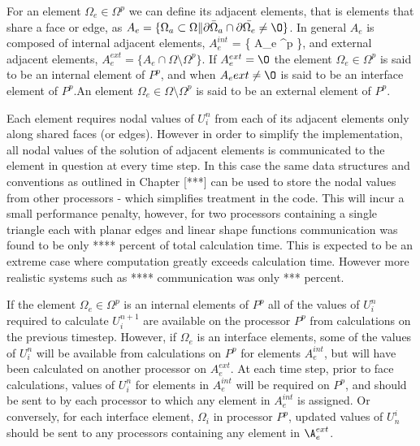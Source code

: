 For an element $\Omega_e \in \Omega^p$ we can define its adjacent elements, that is elements that share a face or edge, as $A_e = \{ \Omega_a \subset \Omega \| \partial \bar{\Omega}_a \cap \partial \bar{\Omega_e} \ne \O \}$. In general $A_e$ is composed of internal adjacent elements, $A_e^{int}$ = \{ A_e \cap \Omega^p \}, and external adjacent elements, $A_e^{ext} = \{ A_e \cap \Omega \setminus \Omega^p \}$. If $A_e^{ext} = \O$ the element $\Omega_e \in \Omega^p$ is said to be an internal element of $P^p$, and when $A_e{ext} \ne \O$ is said to be an interface element of $P^p$.An element $\Omega_e \in \Omega \setminus \Omega^p$ is said to be an external element of $P^p$.


Each element requires nodal values of $U_i^{n}$ from each of its adjacent elements only along shared faces (or edges). However in order to simplify the implementation, all nodal values of the solution of adjacent elements is communicated to the element in question at every time step. In this case the same data structures and conventions as outlined in Chapter [***] can be used to store the nodal values from other processors - which simplifies treatment in the code. This will incur a small performance penalty, however, for two processors containing a single triangle each with planar edges and linear shape functions communication was found to be only **** percent of total calculation time. This is expected to be an extreme case where computation greatly exceeds calculation time. However more realistic systems such as **** communication was only *** percent.

If the element $\Omega_e \in \Omega^p$ is an internal elements of $P^p$ all of the values of $U_i^n$ required to calculate $U_i^{n+1}$ are available on the processor $P^p$ from calculations on the previous timestep. However, if $\Omega_e$ is an interface elements, some of the values of $U_i^{n}$ will be available from calculations on $P^p$ for elements $A_e^{int}$, but will have been calculated on another processor on $A_e^{ext}$. At each time step, prior to face calculations, values of $U_i^{n}$ for elements in $A_e^{int}$ will be required on $P^p$, and should be sent to by each processor to which any element in $A_e^{int}$ is assigned. Or conversely, for each interface element, $\Omega_i$ in processor $P^p$, updated values of $U_n^i$ should be sent to any processors containing any element in $\A_e^{ext}$.


